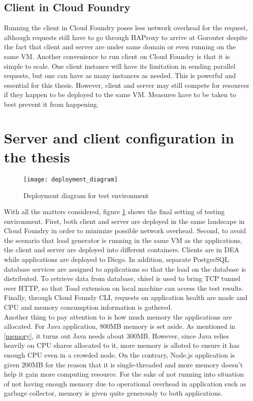 \subsection{Client in Cloud Foundry}
Running the client in Cloud Foundry poses less network overhead for the request, although requests still have to go through HAProxy to arrive at Gorouter despite the fact that client and server are under same domain or even running on the same VM. Another convenience to run client on Cloud Foundry is that it is simple to scale. One client instance will have its limitation in sending parallel requests, but one can have as many instances as needed. This is powerful and essential for this thesis. However, client and server may still compete for resources if they happen to be deployed to the same VM. Measures have to be taken to best prevent it from happening. 

\section{Server and client configuration in the thesis}
\begin{figure}[h]
	\centering
	\texttt{[image: deployment\_diagram]}
	\caption{Deployment diagram for test environment}
	\label{deployment-diagram}
\end{figure}
With all the matters considered, figure \ref{deployment-diagram} shows the final setting of testing environment. First, both client and server are deployed in the same landscape in Cloud Foundry in order to minimize possible network overhead. Second, to avoid the scenario that load generator is running in the same VM as the applications, the client and server are deployed into different containers. Clients are in DEA while applications are deployed to Diego. In addition, separate PostgreSQL database services are assigned to applications so that the load on the database is distributed. To retrieve data from database, chisel is used to bring TCP tunnel over HTTP, so that Toad extension on local machine can access the test results. Finally, through Cloud Foundy CLI, requests on application health are made and CPU and memory consumption information is gathered. \\
Another thing to pay attention to is how much memory the applications are allocated. For Java application, 800MB memory is set aside. As mentioned in \ref{memory}, it turns out Java needs about 300MB. However, since Java relies heavily on CPU shares allocated to it, more memory is alloted to ensure it has enough CPU even in a crowded node. On the contrary, Node.js application is given 200MB for the reason that it is single-threaded and more memory doesn't help it gain more computing resource. For the sake of not running into situation of not having enough memory due to operational overhead in application such as garbage collector, memory is given quite generously to both applications.  



